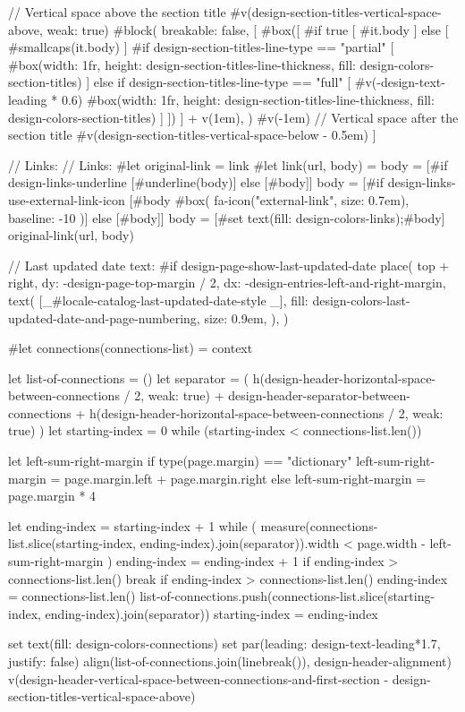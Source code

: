   // Vertical space above the section title
  #v(design-section-titles-vertical-space-above, weak: true)
  #block(
    breakable: false,
    [
      #box([
        #if true [
          #it.body
        ] else [
          #smallcaps(it.body)
        ]
        #if design-section-titles-line-type == "partial" [
          #box(width: 1fr, height: design-section-titles-line-thickness, fill: design-colors-section-titles)
        ] else if design-section-titles-line-type == "full" [
          #v(-design-text-leading * 0.6)
          #box(width: 1fr, height: design-section-titles-line-thickness, fill: design-colors-section-titles)
        ]
      ])
    ] + v(1em),
  )
  #v(-1em)
  // Vertical space after the section title
  #v(design-section-titles-vertical-space-below - 0.5em)
]

// Links:
// Links:
#let original-link = link
#let link(url, body) = {
  body = [#if design-links-underline [#underline(body)] else [#body]]
  body = [#if design-links-use-external-link-icon [#body #box(
        fa-icon("external-link", size: 0.7em),
        baseline: -10%
      )] else [#body]]
  body = [#set text(fill: design-colors-links);#body]
  original-link(url, body)
}

// Last updated date text:
#if design-page-show-last-updated-date {
  place(
    top + right,
    dy: -design-page-top-margin / 2,
    dx: -design-entries-left-and-right-margin,
    text(
      [_#locale-catalog-last-updated-date-style _],
      fill: design-colors-last-updated-date-and-page-numbering,
      size: 0.9em,
    ),
  )
}

#let connections(connections-list) = context {
  let list-of-connections = ()
  let separator = (
    h(design-header-horizontal-space-between-connections / 2, weak: true)
      + design-header-separator-between-connections
      + h(design-header-horizontal-space-between-connections / 2, weak: true)
  )
  let starting-index = 0
  while (starting-index < connections-list.len()) {
    let left-sum-right-margin
    if type(page.margin) == "dictionary" {
      left-sum-right-margin = page.margin.left + page.margin.right
    } else {
      left-sum-right-margin = page.margin * 4
    }

    let ending-index = starting-index + 1
    while (
      measure(connections-list.slice(starting-index, ending-index).join(separator)).width
        < page.width - left-sum-right-margin
    ) {
      ending-index = ending-index + 1
      if ending-index > connections-list.len() {
        break
      }
    }
    if ending-index > connections-list.len() {
      ending-index = connections-list.len()
    }
    list-of-connections.push(connections-list.slice(starting-index, ending-index).join(separator))
    starting-index = ending-index
  }
  set text(fill: design-colors-connections)
  set par(leading: design-text-leading*1.7, justify: false)
  align(list-of-connections.join(linebreak()), design-header-alignment)
  v(design-header-vertical-space-between-connections-and-first-section - design-section-titles-vertical-space-above)
}

